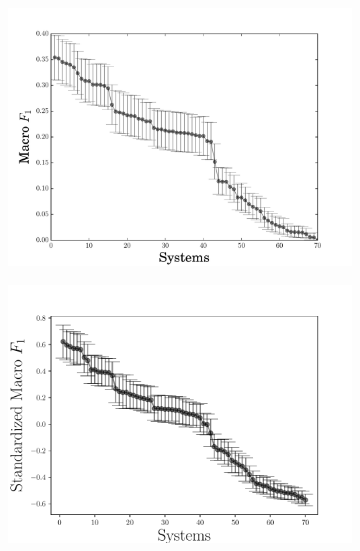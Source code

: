 \begin{figure}
  \begin{subfigure}{0.49\textwidth}
  \includegraphics[width=\columnwidth]{figures/experiment1}
  \caption{\label{fig:f1}}
  \end{subfigure}
  \begin{subfigure}{0.49\textwidth}
  \includegraphics[width=\columnwidth]{figures/experiment3}
  \caption{\label{fig:sf1}}
  \end{subfigure}
  \caption{}
\end{figure}

